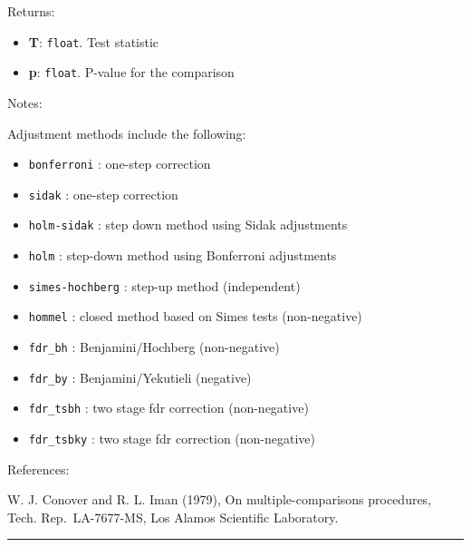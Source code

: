 Returns:

\begin{itemize}
\tightlist
\item
  \textbf{T}: \texttt{float}. Test statistic
\item
  \textbf{p}: \texttt{float}. P-value for the comparison
\end{itemize}

Notes:

Adjustment methods include the following:

\begin{itemize}
\tightlist
\item
  \texttt{bonferroni} : one-step correction
\item
  \texttt{sidak} : one-step correction
\item
  \texttt{holm-sidak} : step down method using Sidak adjustments
\item
  \texttt{holm} : step-down method using Bonferroni adjustments
\item
  \texttt{simes-hochberg} : step-up method (independent)
\item
  \texttt{hommel} : closed method based on Simes tests (non-negative)
\item
  \texttt{fdr\_bh} : Benjamini/Hochberg (non-negative)
\item
  \texttt{fdr\_by} : Benjamini/Yekutieli (negative)
\item
  \texttt{fdr\_tsbh} : two stage fdr correction (non-negative)
\item
  \texttt{fdr\_tsbky} : two stage fdr correction (non-negative)
\end{itemize}

References:

W. J. Conover and R. L. Iman (1979), On multiple-comparisons procedures,
Tech. Rep.~LA-7677-MS, Los Alamos Scientific Laboratory.

\begin{center}\rule{0.5\linewidth}{\linethickness}\end{center}
